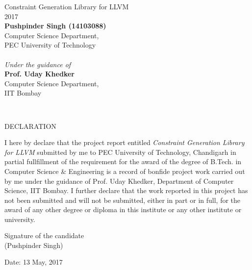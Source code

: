 \documentclass[a4paper,12pt]{report}
\begin{document}
 
\begin{titlepage}
\begin{center}
    \vspace*{\fill}
    \huge{Constraint Generation Library for LLVM}\\
    \vspace{2cm}
    \large{2017}\\


    \vspace{2cm}
    \textbf{Pushpinder Singh (14103088)}\\
    Computer Science Department,\\
    PEC University of Technology\\

    ~\\
    \textit{Under the guidance of}\\
    \textbf{Prof. Uday Khedker}\\
    Computer Science Department,\\
    IIT Bombay

    \vspace*{\fill}
\end{center}
\end{titlepage}

~\\
\vspace{2cm}
\begin{center}
\large{DECLARATION}
\end{center}
\vspace{1cm}

I here by declare that the project report entitled \textit{Constraint Generation Library for LLVM}
submitted by me to PEC University of Technology, Chandigarh in partial fullfillment of the
requirement for the award of the degree of B.Tech. in Computer Science \& Engineering is
a record of bonfide project work carried out by me under the guidance of Prof. Uday Khedker,
Department of Computer Science, IIT Bombay.
I further declare that the work reported in this project has not been submitted and will not
be submitted, either in part or in full, for the award of any other degree or diploma in this
institute or any other institute or university.

\vspace{2cm}

\begin{flushright}
Signature of the candidate\\
(Pushpinder Singh)
\end{flushright}
Date: 13 May, 2017
\end{document}
